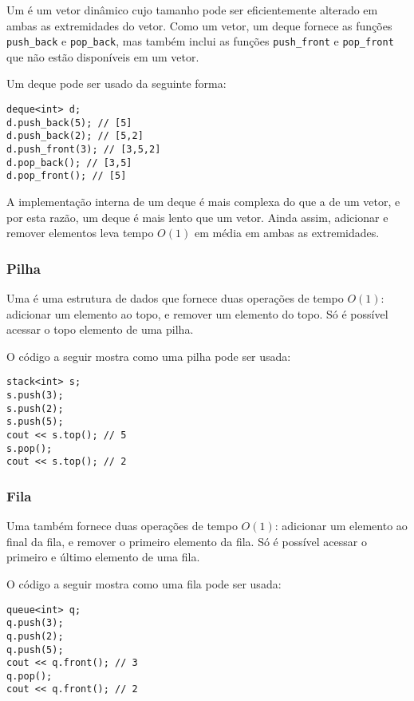 
Um  é um vetor dinâmico
cujo tamanho pode ser eficientemente
alterado em ambas as extremidades do vetor.
Como um vetor, um deque fornece as funções
\texttt{push\_back} e \texttt{pop\_back}, mas
também inclui as funções
\texttt{push\_front} e \texttt{pop\_front}
que não estão disponíveis em um vetor.

Um deque pode ser usado da seguinte forma:
\begin{lstlisting}
deque<int> d;
d.push_back(5); // [5]
d.push_back(2); // [5,2]
d.push_front(3); // [3,5,2]
d.pop_back(); // [3,5]
d.pop_front(); // [5]
\end{lstlisting}

A implementação interna de um deque
é mais complexa do que a de um vetor,
e por esta razão, um deque é mais lento que um vetor.
Ainda assim, adicionar e remover
elementos leva tempo $O(1)$ em média em ambas as extremidades.

\subsubsection{Pilha}


Uma 
é uma estrutura de dados que fornece duas
operações de tempo $O(1)$:
adicionar um elemento ao topo,
e remover um elemento do topo.
Só é possível acessar o topo
elemento de uma pilha.

O código a seguir mostra como uma pilha pode ser usada:
\begin{lstlisting}
stack<int> s;
s.push(3);
s.push(2);
s.push(5);
cout << s.top(); // 5
s.pop();
cout << s.top(); // 2
\end{lstlisting}
\subsubsection{Fila}


Uma  também
fornece duas operações de tempo $O(1)$:
adicionar um elemento ao final da fila,
e remover o primeiro elemento da fila.
Só é possível acessar o primeiro
e último elemento de uma fila.

O código a seguir mostra como uma fila pode ser usada:
\begin{lstlisting}
queue<int> q;
q.push(3);
q.push(2);
q.push(5);
cout << q.front(); // 3
q.pop();
cout << q.front(); // 2
\end{lstlisting}

